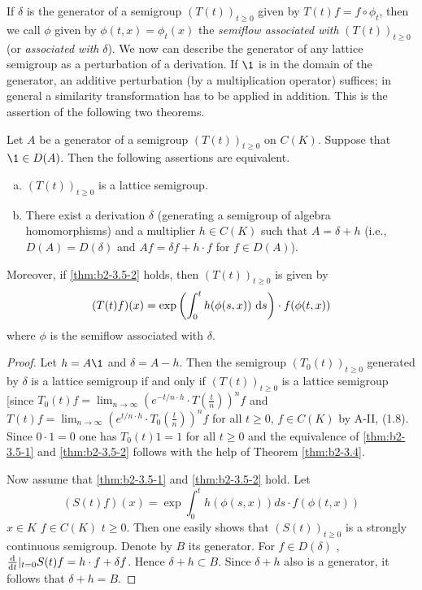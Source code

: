 If $\delta$ is the generator of a semigroup $(T(t))_{t \geq 0}$ given by $T(t)f = f \circ \phi_{t}$, then we call $\phi$ given by $\phi(t,x) = \phi_{t}(x)$ the \emph{semiflow associated with} $(T(t))_{t \geq 0}$ (or \emph{associated with} $\delta$).
We now can describe the generator of any lattice semigroup as a perturbation of a derivation.
If $\1$ is in the domain of the generator, an additive perturbation (by a multiplication operator) suffices; in general a similarity transformation has to be applied in addition.
This is the assertion of the following two theorems.

\begin{theorem}\label{thm:b2-3.5}
Let $A$ be a generator of a semigroup $(T(t))_{t \geq 0}$ on $C(K)$.
Suppose that $\1 \in D(A)$.
Then the following assertions are equivalent.
\begin{enumerate}[(a)]
\item \label{thm:b2-3.5-1}
$(T(t))_{t \geq 0}$ is a lattice semigroup.
\item \label{thm:b2-3.5-2}
There exist a derivation $\delta$ (generating a semigroup of algebra homomorphisms) and a multiplier $h \in C(K)$ such that $A = \delta + h$ (i.e., $D(A) = D(\delta)$ and $Af = \delta f + h \cdot f$ for $f \in D(A)$).
\end{enumerate}

Moreover, if \ref{thm:b2-3.5-2} holds, then $(T(t))_{t \geq 0}$ is given by
\begin{equation}\label{eq:b2-3.6}
(T(t)f)(x) = \exp\left(\int_{0}^{t} h(\phi(s,x))\,\mathop{}\!\mathrm{d}{s}\right) \cdot f(\phi(t,x))
\end{equation}
where $\phi$ is the semiflow associated with $\delta$.
\end{theorem}

\begin{proof}
Let $h = A\1$ and $\delta = A - h$.
Then the semigroup $(T_{0}(t))_{t \geq 0}$ generated by $\delta$ is a lattice semigroup if and only if $(T(t))_{t \geq 0}$ is a lattice semigroup [since $T_{0}(t)f = \lim_{n \to \infty} (e^{-t/n \cdot h} \cdot T(\frac{t}{n}))^{n}f$ and $T(t)f = \lim_{n \to \infty} (e^{t/n \cdot h} \cdot T_{0}(\frac{t}{n}))^{n}f$ for all $t \geq 0$, $f \in C(K)$ by
A-II, (1.8).
Since $0 \cdot 1 = 0$ one has $T_{0}(t)1 = 1$ for all $t \geq 0$ and the equivalence of \ref{thm:b2-3.5-1} and \ref{thm:b2-3.5-2} follows with the help of Theorem \ref{thm:b2-3.4}.

Now assume that \ref{thm:b2-3.5-1} and \ref{thm:b2-3.5-2} hold.
Let
\[
(S(t)f) (x) = \exp \int_{0}^{t} h(\phi(s,x))ds \cdot f(\phi(t,x))
\]
$x \in K$ $f \in C (K)$ $t \geq 0$. 
Then one easily shows that $(S(t))_{t\geq 0}$ is a strongly continuous semigroup.
Denote by $B$ its generator.
For $f \in D(\delta)$ , $\frac{\mathop{}\!\mathrm{d}{}}{\mathop{}\!\mathrm{d}{t}}|_{t = 0}S(t)f = h \cdot f + \delta f$.
Hence $\delta + h \subset B$.  Since $\delta + h$ also is a generator, it follows that $\delta + h = B$.
\end{proof}


